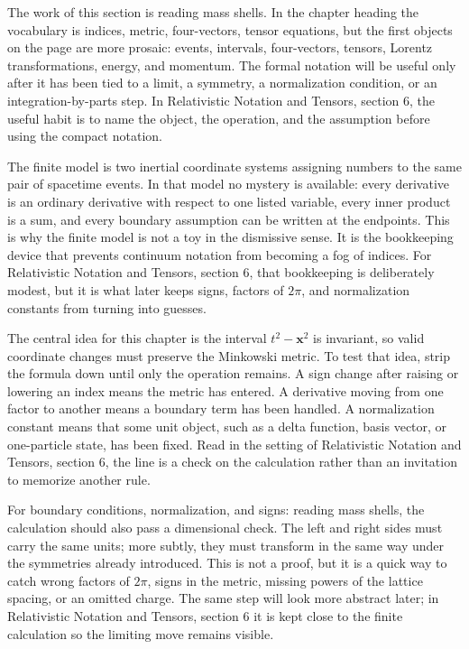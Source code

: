 The work of this section is reading mass shells.  In the chapter heading the vocabulary is indices, metric, four-vectors, tensor equations, but the first objects on the page are more prosaic: events, intervals, four-vectors, tensors, Lorentz transformations, energy, and momentum.  The formal notation will be useful only after it has been tied to a limit, a symmetry, a normalization condition, or an integration-by-parts step.  In Relativistic Notation and Tensors, section 6, the useful habit is to name the object, the operation, and the assumption before using the compact notation.

The finite model is two inertial coordinate systems assigning numbers to the same pair of spacetime events.  In that model no mystery is available: every derivative is an ordinary derivative with respect to one listed variable, every inner product is a sum, and every boundary assumption can be written at the endpoints.  This is why the finite model is not a toy in the dismissive sense.  It is the bookkeeping device that prevents continuum notation from becoming a fog of indices.  For Relativistic Notation and Tensors, section 6, that bookkeeping is deliberately modest, but it is what later keeps signs, factors of \(2\pi\), and normalization constants from turning into guesses.

The central idea for this chapter is the interval \(t^2-\bm x^2\) is invariant, so valid coordinate changes must preserve the Minkowski metric.  To test that idea, strip the formula down until only the operation remains.  A sign change after raising or lowering an index means the metric has entered.  A derivative moving from one factor to another means a boundary term has been handled.  A normalization constant means that some unit object, such as a delta function, basis vector, or one-particle state, has been fixed.  Read in the setting of Relativistic Notation and Tensors, section 6, the line is a check on the calculation rather than an invitation to memorize another rule.

For boundary conditions, normalization, and signs: reading mass shells, the calculation should also pass a dimensional check.  The left and right sides must carry the same units; more subtly, they must transform in the same way under the symmetries already introduced.  This is not a proof, but it is a quick way to catch wrong factors of \(2\pi\), signs in the metric, missing powers of the lattice spacing, or an omitted charge.  The same step will look more abstract later; in Relativistic Notation and Tensors, section 6 it is kept close to the finite calculation so the limiting move remains visible.

